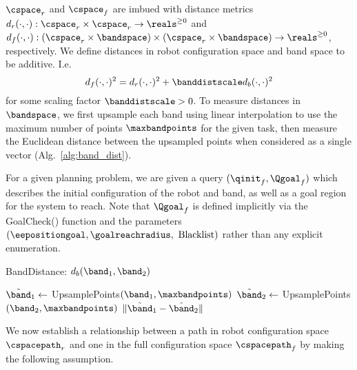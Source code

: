 $\cspace_r$ and $\cspace_f$ are imbued with distance metrics $d_r(\cdot,\cdot) : \cspace_r \times \cspace_r \rightarrow \reals^{\geq 0}$ and $d_f(\cdot,\cdot) : (\cspace_r \times \bandspace) \times (\cspace_r \times \bandspace) \rightarrow \reals^{\geq 0}$, respectively. We define distances in robot configuration space and band space to be additive. I.e.
\begin{equation}
    d_f(\cdot, \cdot)^2 = d_r(\cdot, \cdot)^2 + \banddistscale d_b(\cdot, \cdot)^2
    \label{eqn:dist_metric}
\end{equation}
for some scaling factor $\banddistscale > 0$. To measure distances in $\bandspace$, we first upsample each band using linear interpolation to use the maximum number of points $\maxbandpoints$ for the given task, then measure the Euclidean distance between the upsampled points when considered as a single vector (Alg.~\ref{alg:band_dist}).

For a given planning problem, we are given a query $( \qinit_f, \Qgoal_f )$ which describes the initial configuration of the robot and band, as well as a goal region for the system to reach.  Note that $\Qgoal_f$ is defined implicitly via the GoalCheck() function and the parameters $(\eepositiongoal, \goalreachradius,\textrm{ Blacklist})$ rather than any explicit enumeration.


\begin{algorithm}[t]
\caption{BandDistance: $d_b(\band_1, \band_2)$}
\begin{algorithmic}[1]
    \State $\tilde \band_1 \gets$ UpsamplePoints$(\band_1, \maxbandpoints)$
    \State $\tilde \band_2 \gets$ UpsamplePoints$(\band_2, \maxbandpoints)$
    \State \Return $\| \tilde \band_1 - \tilde \band_2\|$
\end{algorithmic}
\label{alg:band_dist}
\end{algorithm}


We now establish a relationship between a path in robot configuration space $\cspacepath_r$ and one in the full configuration space $\cspacepath_f$ by making the following assumption.


